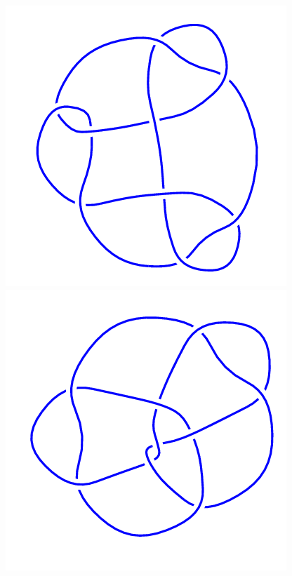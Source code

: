 \begin{figure}[H]
\begin{minipage}[b]{.18\linewidth}
    \end{minipage}
    \begin{minipage}[b]{.18\linewidth}
        \centering
        \includegraphics[width=\linewidth]{../data/9_28.png}
    \end{minipage}
    \begin{minipage}[b]{.18\linewidth}
        \centering
        \includegraphics[width=\linewidth]{../data/9_29.png}

\end{minipage}
\end{figure}
